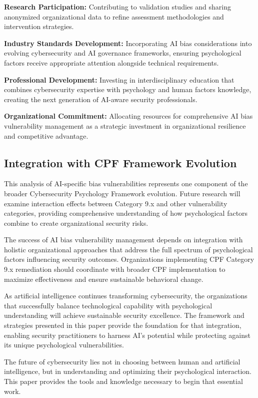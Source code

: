 \documentclass[11pt,a4paper]{article}
\begin{document}
\textbf{Research Participation:} Contributing to validation studies and sharing anonymized organizational data to refine assessment methodologies and intervention strategies.

\textbf{Industry Standards Development:} Incorporating AI bias considerations into evolving cybersecurity and AI governance frameworks, ensuring psychological factors receive appropriate attention alongside technical requirements.

\textbf{Professional Development:} Investing in interdisciplinary education that combines cybersecurity expertise with psychology and human factors knowledge, creating the next generation of AI-aware security professionals.

\textbf{Organizational Commitment:} Allocating resources for comprehensive AI bias vulnerability management as a strategic investment in organizational resilience and competitive advantage.

\subsection{Integration with CPF Framework Evolution}

This analysis of AI-specific bias vulnerabilities represents one component of the broader Cybersecurity Psychology Framework evolution. Future research will examine interaction effects between Category 9.x and other vulnerability categories, providing comprehensive understanding of how psychological factors combine to create organizational security risks.

The success of AI bias vulnerability management depends on integration with holistic organizational approaches that address the full spectrum of psychological factors influencing security outcomes. Organizations implementing CPF Category 9.x remediation should coordinate with broader CPF implementation to maximize effectiveness and ensure sustainable behavioral change.

As artificial intelligence continues transforming cybersecurity, the organizations that successfully balance technological capability with psychological understanding will achieve sustainable security excellence. The framework and strategies presented in this paper provide the foundation for that integration, enabling security practitioners to harness AI's potential while protecting against its unique psychological vulnerabilities.

The future of cybersecurity lies not in choosing between human and artificial intelligence, but in understanding and optimizing their psychological interaction. This paper provides the tools and knowledge necessary to begin that essential work.
\end{document}
